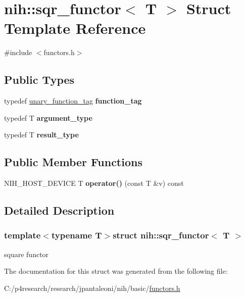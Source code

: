 \hypertarget{structnih_1_1sqr__functor}{
\section{nih\-:\-:sqr\-\_\-functor$<$ \-T $>$ \-Struct \-Template \-Reference}
\label{structnih_1_1sqr__functor}
}


{\ttfamily \#include $<$functors.\-h$>$}

\subsection*{\-Public \-Types}
\begin{DoxyCompactItemize}
\item 
\hypertarget{structnih_1_1sqr__functor_a7cf7565b700be17699328bdb8df14d66}{
typedef \hyperlink{structnih_1_1unary__function__tag}{unary\-\_\-function\-\_\-tag} {\bfseries function\-\_\-tag}}
\label{structnih_1_1sqr__functor_a7cf7565b700be17699328bdb8df14d66}

\item 
\hypertarget{structnih_1_1sqr__functor_a1752e79d1f70eae49085565e61983fb0}{
typedef \-T {\bfseries argument\-\_\-type}}
\label{structnih_1_1sqr__functor_a1752e79d1f70eae49085565e61983fb0}

\item 
\hypertarget{structnih_1_1sqr__functor_a666cf4f3f9b6f93d0e85b33697b3cf54}{
typedef \-T {\bfseries result\-\_\-type}}
\label{structnih_1_1sqr__functor_a666cf4f3f9b6f93d0e85b33697b3cf54}

\end{DoxyCompactItemize}
\subsection*{\-Public \-Member \-Functions}
\begin{DoxyCompactItemize}
\item 
\hypertarget{structnih_1_1sqr__functor_a4706146e5e3d2797131e275935138f6b}{
\-N\-I\-H\-\_\-\-H\-O\-S\-T\-\_\-\-D\-E\-V\-I\-C\-E \-T {\bfseries operator()} (const \-T \&v) const }
\label{structnih_1_1sqr__functor_a4706146e5e3d2797131e275935138f6b}

\end{DoxyCompactItemize}


\subsection{\-Detailed \-Description}
\subsubsection*{template$<$typename T$>$struct nih\-::sqr\-\_\-functor$<$ T $>$}

square functor 

\-The documentation for this struct was generated from the following file\-:\begin{DoxyCompactItemize}
\item 
\-C\-:/p4research/research/jpantaleoni/nih/basic/\hyperlink{functors_8h}{functors.\-h}\end{DoxyCompactItemize}
